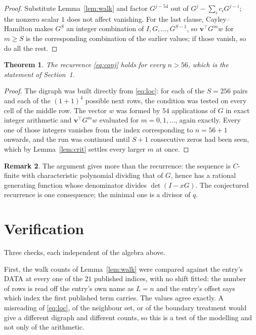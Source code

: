 \documentclass[11pt,a4paper]{article}
\theoremstyle{plain}
\newtheorem{theorem}{Theorem}
\theoremstyle{definition}
\newtheorem{remark}[theorem]{Remark}
\begin{document}
\begin{proof}
Substitute Lemma~\ref{lem:walk} and factor $G^{j-54}$ out of
$G^{j}-\sum_ic_iG^{j-i}$; the nonzero scalar $1$ does not affect
vanishing. For the last clause, Cayley--Hamilton makes $G^{S}$ an integer combination of
$I,G,\dots,G^{S-1}$, so $\mathbf{v}^{\!\top}G^{m}w$ for $m\ge S$ is the corresponding
combination of the earlier values; if those vanish, so do all the rest.
\end{proof}

\begin{theorem}
The recurrence \eqref{eq:conj} holds for every $n>56$, which is the statement of
Section~1.
\end{theorem}

\begin{proof}
The digraph was built directly from \eqref{eq:loc}: for each of the $S=256$ pairs and each
of the $(1+1)^{4}$ possible next rows, the condition was tested on every cell of
the middle row. The vector $w$ was formed by $54$ applications of $G$ in exact integer
arithmetic and $\mathbf{v}^{\!\top}G^{m}w$ evaluated for $m=0,1,\dots$, again exactly.
Every one of those integers vanishes from the index corresponding to $n=56+1$ onwards,
and the run was continued until $S+1$ consecutive zeros had been seen, which by
Lemma~\ref{lem:crit} settles every larger $m$ at once.
\end{proof}

\begin{remark}
The argument gives more than the recurrence: the sequence is $C$-finite with characteristic
polynomial dividing that of $G$, hence has a rational generating function whose denominator
divides $\det(I-xG)$. The conjectured recurrence is one consequence; the minimal one is a
divisor of $q$.
\end{remark}

\section{Verification}

Three checks, each independent of the algebra above.

First, the walk counts of Lemma~\ref{lem:walk} were compared against the entry's DATA at
every one of the $21$ published indices, with no shift fitted: the number of rows is
read off the entry's own name as $L=n$ and the entry's offset says which index the first
published term carries. The values agree exactly. A misreading of \eqref{eq:loc}, of the
neighbour set, or of the boundary treatment would give a different digraph and different
counts, so this is a test of the modelling and not only of the arithmetic.
\end{document}
